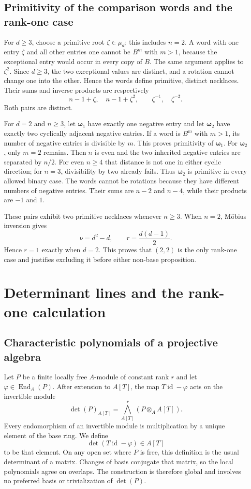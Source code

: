 \documentclass[11pt]{article}
\theoremstyle{definition}
\theoremstyle{remark}
\newcommand{\id}{\operatorname{id}}
\newcommand{\bw}{\boldsymbol{\omega}}
\begin{document}
\subsection{Primitivity of the comparison words and the rank-one case}

For $d\geq3$, choose a primitive root $\zeta\in\mu_d$; this includes
$n=2$.  A word with one entry $\zeta$ and all other entries one cannot be
$B^m$ with $m>1$, because the exceptional entry would occur in every copy
of $B$.  The same argument applies to $\zeta^2$.  Since $d\geq3$, the two
exceptional values are distinct, and a rotation cannot change one into the
other.  Hence the words define primitive, distinct necklaces.  Their
sums and inverse products are respectively
\[
 n-1+\zeta,\quad n-1+\zeta^2,
 \qquad
 \zeta^{-1},\quad\zeta^{-2}.
\]
Both pairs are distinct.

For $d=2$ and $n\geq3$, let $\bw_1$ have exactly one negative entry and let
$\bw_2$ have exactly two cyclically adjacent negative entries.  If a word is
$B^m$ with $m>1$, its number of negative entries is divisible by $m$.
This proves primitivity of $\bw_1$.  For $\bw_2$, only $m=2$ remains.  Then
$n$ is even and the two inherited negative entries are separated by $n/2$.
For even $n\geq4$ that distance is not one in either cyclic direction; for
$n=3$, divisibility by two already fails.  Thus $\bw_2$ is primitive in
every allowed binary case.  The words
cannot be rotations because they have different numbers of negative entries.
Their sums are $n-2$ and $n-4$, while their products are $-1$ and $1$.

These pairs exhibit two primitive necklaces whenever $n\geq3$.  When $n=2$,
M\"obius inversion gives
\[
 \nu=d^2-d,\qquad r=\frac{d(d-1)}{2}.
\]
Hence $r=1$ exactly when $d=2$.  This proves that $(2,2)$ is the only
rank-one case and justifies excluding it before either non-base proposition.

\section{Determinant lines and the rank-one calculation}
\label{app:det}

\subsection{Characteristic polynomials of a projective algebra}

Let $P$ be a finite locally free $A$-module of constant rank $r$ and let
$\varphi\in\operatorname{End}_A(P)$.  After extension to $A[T]$, the map
$T\id-\varphi$ acts on the invertible module
\[
 \det(P)_{A[T]}
 =\bigwedge_{A[T]}^r(P\otimes_AA[T]).
\]
Every endomorphism of an invertible module is multiplication by a unique
element of the base ring.  We define
\[
 \det(T\id-\varphi)\in A[T]
\]
to be that element.  On any open set where $P$ is free, this definition is
the usual determinant of a matrix.  Changes of basis conjugate that matrix,
so the local polynomials agree on overlaps.  The construction is therefore
global and involves no preferred basis or trivialization of $\det(P)$.
\end{document}
